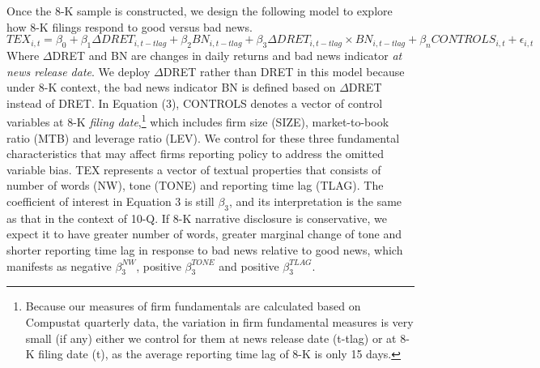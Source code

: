 \documentclass[a4paper]{article}
\begin{document}
\begin{spacing}{2}
Once the 8-K sample is constructed, we design the following model to explore how 8-K filings respond to good versus bad news.
\begin{equation} \label{eq3}
TEX_{i,t}=\beta_0+\beta_1\Delta DRET_{i,t-tlag}+\beta_2BN_{i,t-tlag}+\beta_3\Delta DRET_{i,t-tlag}\times BN_{i,t-tlag}+\beta_nCONTROLS_{i,t}+\epsilon_{i,t}
\end{equation}
Where $\Delta$DRET and BN are changes in daily returns and bad news indicator \textit{at news release date}. We deploy $\Delta$DRET rather than DRET in this model because under 8-K context, the bad news indicator BN is defined based on $\Delta$DRET instead of DRET. In Equation (3), CONTROLS denotes a vector of control variables at 8-K \textit{filing date},\footnote{Because our measures of firm fundamentals are calculated based on Compustat quarterly data, the variation in firm fundamental measures is very small (if any) either we control for them at news release date (t-tlag) or at 8-K filing date (t), as the average reporting time lag of 8-K is only 15 days.} which includes firm size (SIZE), market-to-book ratio (MTB) and leverage ratio (LEV). We control for these three fundamental characteristics that may affect firms reporting policy to address the omitted variable bias. TEX represents a vector of textual properties that consists of number of words (NW), tone (TONE) and reporting time lag (TLAG). The coefficient of interest in Equation 3 is still $\beta_3$, and its interpretation is the same as that in the context of 10-Q. If 8-K narrative disclosure is conservative, we expect it to have greater number of words, greater marginal change of tone and shorter reporting time lag in response to bad news relative to good news, which manifests as negative $\beta_3^{NW}$, positive  $\beta_3^{TONE}$ and positive $\beta_3^{TLAG}$.


\end{spacing}
\end{document}
